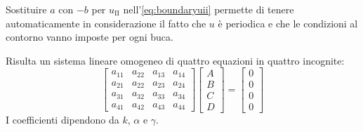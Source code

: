 Sostituire $a$ con $-b$ per $u_\mathrm{II}$ nell'\cref{eq:boundaryuii} permette di tenere automaticamente in considerazione il fatto che $u$ è periodica e che le condizioni al contorno vanno imposte per ogni buca.

Risulta un sistema lineare omogeneo di quattro equazioni in quattro incognite:
\begin{equation}
    \begin{bmatrix}
        a_{11} & a_{22} & a_{13} & a_{14} \\
        a_{21} & a_{22} & a_{23} & a_{24} \\
        a_{31} & a_{32} & a_{33} & a_{34} \\
        a_{41} & a_{42} & a_{43} & a_{44}
    \end{bmatrix}
    \begin{bmatrix}
        A \\ B \\ C \\ D
    \end{bmatrix}
    = \begin{bmatrix}
        0 \\ 0 \\ 0 \\ 0
    \end{bmatrix}
\end{equation}
I coefficienti dipendono da $k$, $\alpha$ e $\gamma$.

